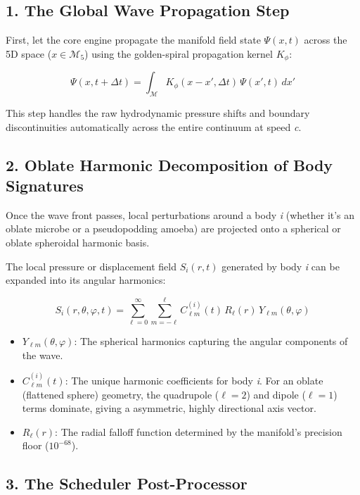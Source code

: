 \subsection{\texorpdfstring{1. The Global Wave Propagation Step}{1. The Global Wave Propagation Step}}

First, let the core engine propagate the manifold field state \(\Psi(x, t)\) across the 5D space (\(x \in \mathcal{M}_5\)) using the golden-spiral propagation kernel \(K_\phi\):

\[
\Psi(x, t + \Delta t) = \int_{\mathcal{M}} K_\phi(x - x', \Delta t)\, \Psi(x', t)\, dx'
\]

This step handles the raw hydrodynamic pressure shifts and boundary discontinuities automatically across the entire continuum at speed \emph{c}.

\subsection{\texorpdfstring{2. Oblate Harmonic Decomposition of Body Signatures}{2. Oblate Harmonic Decomposition of Body Signatures}}

Once the wave front passes, local perturbations around a body \emph{i} (whether it's an oblate microbe or a pseudopodding amoeba) are projected onto a spherical or oblate spheroidal harmonic basis.

The local pressure or displacement field \(S_i(r, t)\) generated by body \emph{i} can be expanded into its angular harmonics:

\[
S_i(r, \theta, \varphi, t) = \sum_{\ell=0}^{\infty} \sum_{m=-\ell}^{\ell} C_{\ell m}^{(i)}(t)\, R_\ell(r)\, Y_{\ell m}(\theta, \varphi)
\]

\begin{itemize}
\item \(Y_{\ell m}(\theta, \varphi)\): The spherical harmonics capturing the angular components of the wave.
\item \(C_{\ell m}^{(i)}(t)\): The unique harmonic coefficients for body \emph{i}. For an oblate (flattened sphere) geometry, the quadrupole (\(\ell = 2\)) and dipole (\(\ell = 1\)) terms dominate, giving a asymmetric, highly directional axis vector.
\item \(R_\ell(r)\): The radial falloff function determined by the manifold's precision floor (\(10^{-68}\)).
\end{itemize}

\subsection{\texorpdfstring{3. The Scheduler Post-Processor}{3. The Scheduler Post-Processor}}

